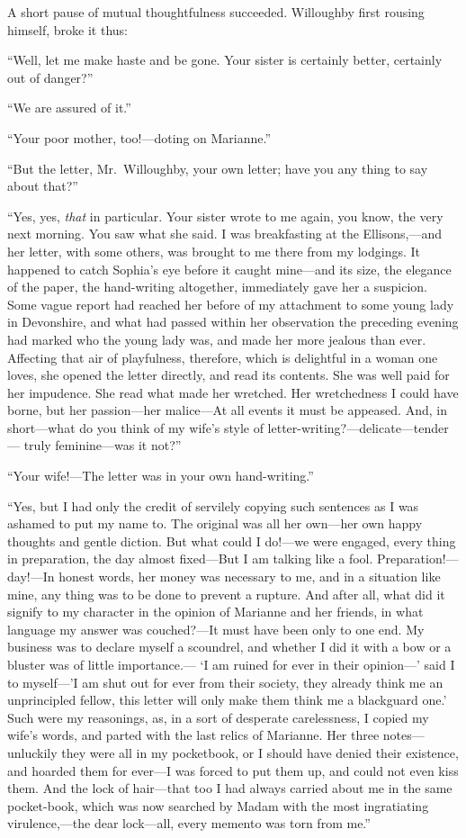 A short pause of mutual thoughtfulness succeeded.
Willoughby first rousing himself, broke it thus:

``Well, let me make haste and be gone.  Your sister
is certainly better, certainly out of danger?''

``We are assured of it.''

``Your poor mother, too!---doting on Marianne.''

``But the letter, Mr.\ Willoughby, your own letter;
have you any thing to say about that?''

``Yes, yes, \emph{that} in particular.  Your sister
wrote to me again, you know, the very next morning.
You saw what she said.  I was breakfasting at the
Ellisons,---and her letter, with some others, was brought
to me there from my lodgings.  It happened to catch
Sophia's eye before it caught mine---and its size,
the elegance of the paper, the hand-writing altogether,
immediately gave her a suspicion.  Some vague report had
reached her before of my attachment to some young lady
in Devonshire, and what had passed within her observation
the preceding evening had marked who the young lady was,
and made her more jealous than ever.  Affecting that air
of playfulness, therefore, which is delightful in a woman
one loves, she opened the letter directly, and read
its contents.  She was well paid for her impudence.
She read what made her wretched.  Her wretchedness I could
have borne, but her passion---her malice---At all events it
must be appeased.  And, in short---what do you think of my
wife's style of letter-writing?---delicate---tender---%
truly feminine---was it not?''

``Your wife!---The letter was in your own hand-writing.''

``Yes, but I had only the credit of servilely copying
such sentences as I was ashamed to put my name to.
The original was all her own---her own happy thoughts
and gentle diction.  But what could I do!---we were engaged,
every thing in preparation, the day almost fixed---But I am
talking like a fool.  Preparation!---day!---In honest words,
her money was necessary to me, and in a situation like
mine, any thing was to be done to prevent a rupture.
And after all, what did it signify to my character
in the opinion of Marianne and her friends, in what language
my answer was couched?---It must have been only to one end.
My business was to declare myself a scoundrel, and whether
I did it with a bow or a bluster was of little importance.---%
`I am ruined for ever in their opinion---' said I to
myself---'I am shut out for ever from their society,
they already think me an unprincipled fellow, this letter
will only make them think me a blackguard one.' Such were
my reasonings, as, in a sort of desperate carelessness,
I copied my wife's words, and parted with the last relics
of Marianne.  Her three notes---unluckily they were all
in my pocketbook, or I should have denied their existence,
and hoarded them for ever---I was forced to put them up,
and could not even kiss them.  And the lock of hair---that too
I had always carried about me in the same pocket-book,
which was now searched by Madam with the most ingratiating
virulence,---the dear lock---all, every memento was torn from me.''

